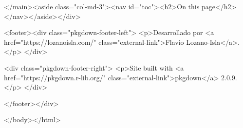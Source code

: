   </main><aside class="col-md-3"><nav id="toc"><h2>On this page</h2>
    </nav></aside></div>



    <footer><div class="pkgdown-footer-left">
  <p>Desarrollado por <a href="https://lozanoisla.com/" class="external-link">Flavio Lozano-Isla</a>.</p>
</div>

<div class="pkgdown-footer-right">
  <p>Site built with <a href="https://pkgdown.r-lib.org/" class="external-link">pkgdown</a> 2.0.9.</p>
</div>

    </footer></div>

  

  

  </body></html>
